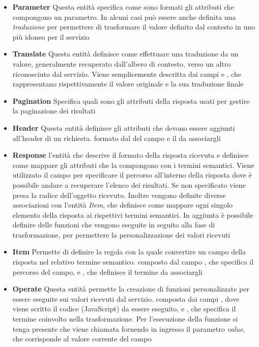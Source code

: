 \begin{itemize}
	\item \textbf{Parameter} Questa entità specifica come sono formati gli attributi che compongono un parametro. In alcuni casi può essere anche definita una \emph{traduzione} per permettere di trasformare il valore definito dal contesto in uno più idoneo per il servizio
	\item \textbf{Translate} Questa entità definisce come effettuare una traduzione da un valore, generalmente recuperato dall'albero di contesto, verso un altro riconosciuto dal servizio. Viene semplicemente descritta dai campi  e , che rappresentano rispettivamente il valore originale e la sua traduzione finale
	\item \textbf{Pagination} Specifica quali sono gli attributi della risposta usati per gestire la paginazione dei risultati
	\item \textbf{Header} Questa entità definisce gli attributi che devono essere aggiunti all'header di un richiesta. \upe formato dal  del campo e il  da associargli
	\item \textbf{Response} \upe l'entità che descrive il formato della risposta ricevuta e definisce come mappare gli attributi che la compongono con i termini semantici. Viene utilizzato il campo  per specificare il percorso all'interno della risposta dove è possibile andare a recuperare l'elenco dei risultati. Se non specificato viene presa la radice dell'oggetto ricevuto. Inoltre vengono definite diverse associazioni con l'entità \emph{Item}, che definisce come mappare ogni singolo elemento della risposta ai rispettivi termini semantici. In aggiunta è possibile definire delle funzioni che vengono eseguite in seguito alla fase di trasformazione, per permettere la personalizzazione dei valori ricevuti
	\item \textbf{Item} Permette di definire la regola con la quale convertire un campo della risposta nel relativo termine semantico. \upe composto dal campo , che specifica il percorso del campo, e , che definisce il termine da associargli
	\item \textbf{Operate} Questa entità permette la creazione di funzioni personalizzate per essere eseguite sui valori ricevuti dal servizio. \upe composta dai campi , dove viene scritto il codice (JavaScript) da essere eseguito, e , che specifica il termine coinvolto nella trasformazione. Per l'esecuzione della funzione si tenga presente che viene chiamata fornendo in ingresso il parametro \emph{value}, che corrisponde al valore corrente del campo

\end{itemize}

